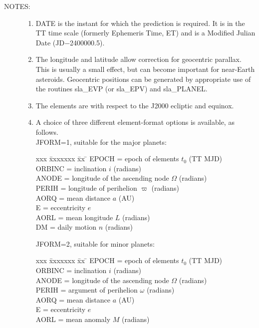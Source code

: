 \documentclass[11pt,twoside]{article}
\newlength{\oldspacing}
\newcommand{\notes}[1]
{
  \goodbreak
  \setlength{\oldspacing}{\topsep}
  \setlength{\topsep}{0.3ex}
  \begin{description}
    \item[NOTES]:
        #1
  \end{description}
  \setlength{\topsep}{\oldspacing}
}
\renewcommand{\notes}[1]
   {
      \begin{description}
         \item[NOTES:]
            #1
      \end{description}
   }
\begin{document}
\notes
{
 \begin{enumerate}
  \item DATE is the instant for which the prediction is
        required.  It is in the TT time scale (formerly
        Ephemeris Time, ET) and is a
        Modified Julian Date (JD$-$2400000.5).
  \item The longitude and latitude allow correction for geocentric
        parallax.  This is usually a small effect, but can become
        important for near-Earth asteroids.  Geocentric positions
        can be generated by appropriate use of the routines
        sla\_EVP (or sla\_EPV) and sla\_PLANEL.
  \item The elements are with respect to the J2000 ecliptic and equinox.
  \item A choice of three different element-format options is available, as
        follows. \\

        JFORM=1, suitable for the major planets:

        \begin{tabbing}
        xxx \= xxxxxxx \= xx \= \kill
        \> EPOCH  \> = \> epoch of elements $t_0$ (TT MJD) \\
        \> ORBINC \> = \> inclination $i$ (radians) \\
        \> ANODE  \> = \> longitude of the ascending node $\Omega$ (radians) \\
        \> PERIH  \> = \> longitude of perihelion $\varpi$ (radians) \\
        \> AORQ   \> = \> mean distance $a$ (AU) \\
        \> E      \> = \> eccentricity $e$ \\
        \> AORL   \> = \> mean longitude $L$ (radians) \\
        \> DM     \> = \> daily motion $n$ (radians)
        \end{tabbing}

        JFORM=2, suitable for minor planets:

        \begin{tabbing}
        xxx \= xxxxxxx \= xx \= \kill
        \> EPOCH  \> = \> epoch of elements $t_0$ (TT MJD) \\
        \> ORBINC \> = \> inclination $i$ (radians) \\
        \> ANODE  \> = \> longitude of the ascending node $\Omega$ (radians) \\
        \> PERIH  \> = \> argument of perihelion $\omega$ (radians) \\
        \> AORQ   \> = \> mean distance $a$ (AU) \\
        \> E      \> = \> eccentricity $e$ \\
        \> AORL   \> = \> mean anomaly $M$ (radians)
        \end{tabbing}


\end{enumerate}}
\end{document}
